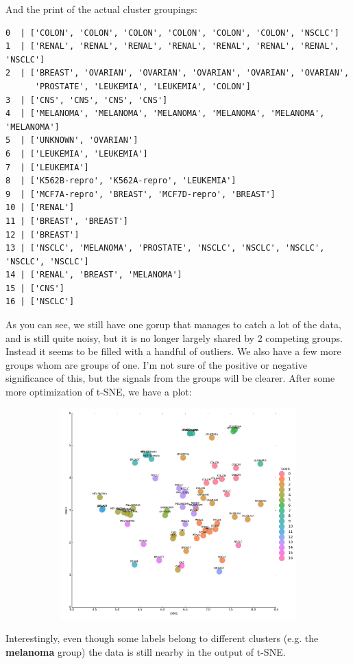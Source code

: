 \documentclass[20pt]{article} %
\begin{document}
And the print of the actual cluster groupings:
\begin{verbatim}
0  | ['COLON', 'COLON', 'COLON', 'COLON', 'COLON', 'COLON', 'NSCLC']
1  | ['RENAL', 'RENAL', 'RENAL', 'RENAL', 'RENAL', 'RENAL', 'RENAL', 'NSCLC']
2  | ['BREAST', 'OVARIAN', 'OVARIAN', 'OVARIAN', 'OVARIAN', 'OVARIAN', 
      'PROSTATE', 'LEUKEMIA', 'LEUKEMIA', 'COLON']
3  | ['CNS', 'CNS', 'CNS', 'CNS']
4  | ['MELANOMA', 'MELANOMA', 'MELANOMA', 'MELANOMA', 'MELANOMA', 'MELANOMA']
5  | ['UNKNOWN', 'OVARIAN']
6  | ['LEUKEMIA', 'LEUKEMIA']
7  | ['LEUKEMIA']
8  | ['K562B-repro', 'K562A-repro', 'LEUKEMIA']
9  | ['MCF7A-repro', 'BREAST', 'MCF7D-repro', 'BREAST']
10 | ['RENAL']
11 | ['BREAST', 'BREAST']
12 | ['BREAST']
13 | ['NSCLC', 'MELANOMA', 'PROSTATE', 'NSCLC', 'NSCLC', 'NSCLC', 'NSCLC', 'NSCLC']
14 | ['RENAL', 'BREAST', 'MELANOMA']
15 | ['CNS']
16 | ['NSCLC']
\end{verbatim}
As you can see, we still have one gorup that manages to catch a lot of the data, and is still quite noisy, but it is no longer largely shared by 2 competing groups.  Instead it seems to be filled with a handful of outliers.  We also have a few more groups whom are groups of one.  I'm not sure of the positive or negative significance of this, but the signals from the groups will be clearer.  After some more optimization of t-SNE, we have a plot:

\newpage
\begin{figure}[!htbp]
  	\centering
   	\begin{subfigure}[p]{1.2\linewidth}
    	\includegraphics[width=\linewidth]{./figures/another_tsne.png}
   	\end{subfigure}
\end{figure}
Interestingly, even though some labels belong to different clusters (e.g. the \textbf{melanoma} group) the data is still nearby in the output of t-SNE.
\end{document}

